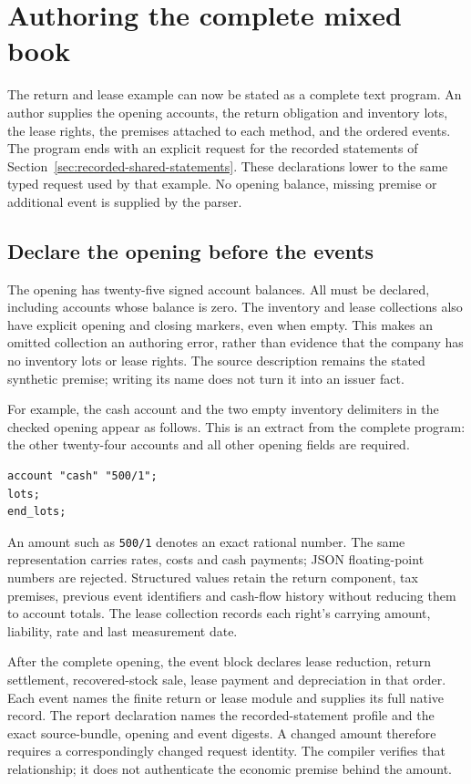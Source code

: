 \section{Authoring the complete mixed book}
\label{sec:shared-book-authoring}

The return and lease example can now be stated as a complete text program.
An author supplies the opening accounts, the return obligation and inventory
lots, the lease rights, the premises attached to each method, and the ordered
events. The program ends with an explicit request for the recorded statements
of Section~\ref{sec:recorded-shared-statements}. These declarations lower to
the same typed request used by that example. No opening balance, missing
premise or additional event is supplied by the parser.

\subsection{Declare the opening before the events}

The opening has twenty-five signed account balances. All must be declared,
including accounts whose balance is zero. The inventory and lease collections
also have explicit opening and closing markers, even when empty. This makes
an omitted collection an authoring error, rather than evidence that the company
has no inventory lots or lease rights. The source description remains the
stated synthetic premise; writing its name does not turn it into an issuer fact.

For example, the cash account and the two empty inventory delimiters in the
checked opening appear as follows. This is an extract from the complete program:
the other twenty-four accounts and all other opening fields are required.
\begin{verbatim}
account "cash" "500/1";
lots;
end_lots;
\end{verbatim}
An amount such as \texttt{500/1} denotes an exact rational number. The same
representation carries rates, costs and cash payments; JSON floating-point
numbers are rejected. Structured values retain the return component, tax
premises, previous event identifiers and cash-flow history without reducing
them to account totals. The lease collection records each right's carrying
amount, liability, rate and last measurement date.

After the complete opening, the event block declares lease reduction, return
settlement, recovered-stock sale, lease payment and depreciation in that
order. Each event names the finite return or lease module and supplies its
full native record. The report declaration names the recorded-statement
profile and the exact source-bundle, opening and event digests. A changed
amount therefore requires a correspondingly changed request identity.
The compiler verifies that relationship; it does not authenticate the
economic premise behind the amount.

